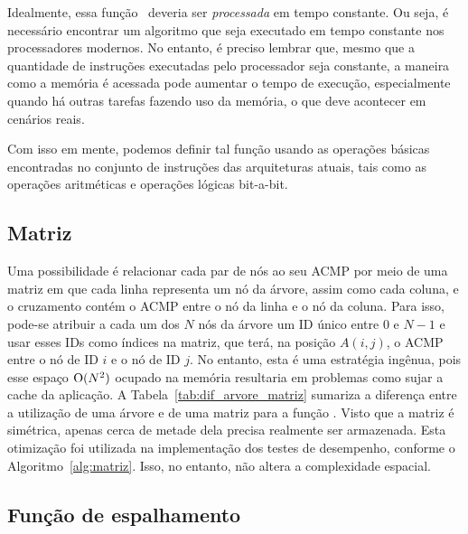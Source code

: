 Idealmente, essa função \ACMPIDs\ deveria ser \textit{processada} em tempo constante.
Ou seja, é necessário encontrar um algoritmo que seja executado em tempo constante nos processadores modernos.
No entanto, é preciso lembrar que, mesmo que a quantidade de instruções executadas pelo processador seja constante,
a maneira como a memória é acessada pode aumentar o tempo de execução, especialmente quando há outras tarefas fazendo uso da memória, o que deve acontecer em cenários reais.

Com isso em mente, podemos definir tal função usando as operações básicas encontradas no conjunto de instruções das arquiteturas atuais,
tais como as operações aritméticas e operações lógicas bit-a-bit.

\subsection{Matriz}

Uma possibilidade é relacionar cada par de nós ao seu ACMP por meio de uma matriz
em que cada linha representa um nó da árvore, assim como cada coluna, e o cruzamento contém o ACMP entre o nó da linha e o nó da coluna.
Para isso, pode-se atribuir a cada um dos $N$ nós da árvore um ID único entre $0$ e $N-1$ e usar esses IDs como índices na matriz,
que terá, na posição $A(i,j)$, o ACMP entre o nó de ID $i$ e o nó de ID $j$.
No entanto, esta é uma estratégia ingênua, pois esse espaço $\operatorname{O}(N^2)$ ocupado na memória resultaria em problemas como sujar a cache da aplicação.
A Tabela~\ref{tab:dif_arvore_matriz} sumariza a diferença entre a utilização de uma árvore e de uma matriz para a função \fACMP.
Visto que a matriz é simétrica, apenas cerca de metade dela precisa realmente ser armazenada.
Esta otimização foi utilizada na implementação dos testes de desempenho, conforme o Algoritmo~\ref{alg:matriz}.
Isso, no entanto, não altera a complexidade espacial.





\subsection{Função de espalhamento}

